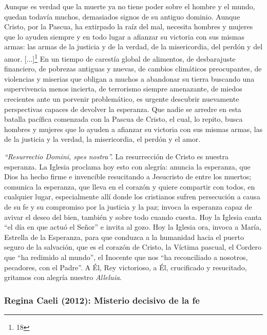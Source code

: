 			\begin{body}Aunque es verdad que la muerte ya no tiene poder sobre el hombre y el mundo, quedan todavía muchos, demasiados signos de su antiguo dominio. Aunque Cristo, por la Pascua, ha extirpado la raíz del mal, necesita hombres y mujeres que lo ayuden siempre y en todo lugar a afianzar su victoria con sus mismas armas: las armas de la justicia y de la verdad, de la misericordia, del perdón y del amor. [...]\footnote{18} En un tiempo de carestía global de alimentos, de desbarajuste financiero, de pobrezas antiguas y nuevas, de cambios climáticos preocupantes, de violencias y miserias que obligan a muchos a abandonar su tierra buscando una supervivencia menos incierta, de terrorismo siempre amenazante, de miedos crecientes ante un porvenir problemático, es urgente descubrir nuevamente perspectivas capaces de devolver la esperanza. Que nadie se arredre en esta batalla pacífica comenzada con la Pascua de Cristo, el cual, lo repito, busca hombres y mujeres que lo ayuden a afianzar su victoria con sus mismas armas, las de la justicia y la verdad, la misericordia, el perdón y el amor.\end{body}
			
			\begin{body}\textit{“Resurrectio Domini, spes nostra”. }La resurrección de Cristo es nuestra esperanza. La Iglesia proclama hoy esto con alegría: anuncia la esperanza, que Dios ha hecho firme e invencible resucitando a Jesucristo de entre los muertos; comunica la esperanza, que lleva en el corazón y quiere compartir con todos, en cualquier lugar, especialmente allí donde los cristianos sufren persecución a causa de su fe y su compromiso por la justicia y la paz; invoca la esperanza capaz de avivar el deseo del bien, también y sobre todo cuando cuesta. Hoy la Iglesia canta “el día en que actuó el Señor” e invita al gozo. Hoy la Iglesia ora, invoca a María, Estrella de la Esperanza, para que conduzca a la humanidad hacia el puerto seguro de la salvación, que es el corazón de Cristo, la Víctima pascual, el Cordero que “ha redimido al mundo”, el Inocente que nos “ha reconciliado a nosotros, pecadores, con el Padre”. A Él, Rey victorioso, a Él, crucificado y resucitado, gritamos con alegría nuestro \textit{Alleluia}.\end{body}
			
			\subsubsection{Regina Caeli (2012): Misterio decisivo de la fe}
			
